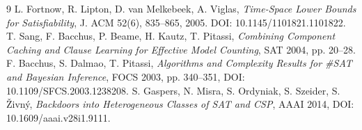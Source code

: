 \documentclass[11pt]{article}
\begin{document}
\begin{thebibliography}{9}
 L. Fortnow, R. Lipton, D. van Melkebeek, A. Viglas,
\emph{Time-Space Lower Bounds for Satisfiability}, J. ACM 52(6),
835--865, 2005. DOI: 10.1145/1101821.1101822.
 T. Sang, F. Bacchus, P. Beame, H. Kautz, T. Pitassi,
\emph{Combining Component Caching and Clause Learning for Effective Model
Counting}, SAT 2004, pp. 20--28.
 F. Bacchus, S. Dalmao, T. Pitassi,
\emph{Algorithms and Complexity Results for \#SAT and Bayesian Inference},
FOCS 2003, pp. 340--351, DOI: 10.1109/SFCS.2003.1238208.
 S. Gaspers, N. Misra, S. Ordyniak, S. Szeider, S.
\v{Z}ivn\'y, \emph{Backdoors into Heterogeneous Classes of SAT and CSP},
AAAI 2014, DOI: 10.1609/aaai.v28i1.9111.
\end{thebibliography}
\end{document}
